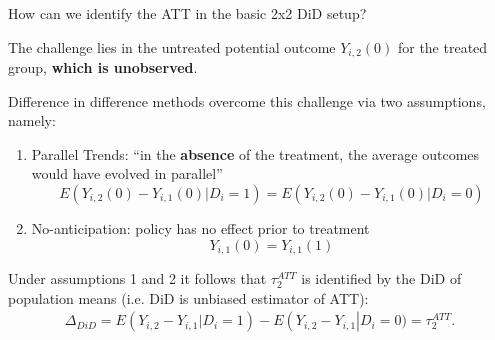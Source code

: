 \documentclass[notes,11pt, aspectratio=169]{beamer}
\newenvironment{wideitemize}{\itemize\addtolength{\itemsep}{10pt}}{\enditemize}
\begin{document}
\begin{frame}{How can we identify the ATT in the basic 2x2 DiD setup?}
  \begin{wideitemize}
      \item The challenge lies in the untreated potential outcome $Y_{i,2}(0)$ for the treated group, \textbf{which is unobserved}.  
      \item Difference in difference methods overcome this challenge via two assumptions, namely:
  \end{wideitemize}
  \begin{enumerate}
  \item Parallel Trends: ``in the \textbf{absence} of the treatment, the average outcomes would have evolved in parallel''
    \begin{equation*}
        E(Y_{i,2}(0) - Y_{i,1}(0) | D_{i} = 1) =     E(Y_{i,2}(0) - Y_{i,1}(0) | D_{i} = 0)
      \end{equation*}
    \item No-anticipation: policy has no effect prior to treatment
    \begin{equation*}
        Y_{i,1}(0) = Y_{i,1}(1) 
      \end{equation*}
    \end{enumerate}
    \begin{wideitemize}
        \item Under assumptions 1 and 2 it follows that $\tau_{2}^{ATT}$ is identified by the DiD of population means (i.e. DiD is unbiased estimator of ATT):
        \end{wideitemize}
          \begin{align*}
      \Delta_{DiD}=E(Y_{i,2} - Y_{i,1} | D_{i} = 1) - E\left(Y_{i,2} - Y_{i,1}\right| D_{i} = 0)=\tau_{2}^{ATT}. 
    \end{align*}
\end{frame}
\end{document}
